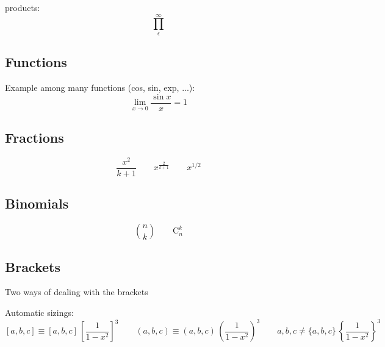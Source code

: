\documentclass[12pt, oneside]{article}
\begin{document}
products:
\begin{displaymath}
\prod_\epsilon^\infty
\end{displaymath}



\subsection{Functions}
Example among many functions (cos, sin, exp, ...):
\begin{displaymath}
\lim_{x \rightarrow 0} \frac{\sin x}{x} = 1
\end{displaymath}



\subsection{Fractions}
\begin{displaymath}
\frac{x^{2}}{k+1} \qquad x^{\frac{2}{k+1}} \qquad x^{1/2} %
\end{displaymath}



\subsection{Binomials}
\begin{displaymath}
\binom{n}{k} \qquad \mathrm{C}_n^k
\end{displaymath}



\subsection{Brackets}
Two ways of dealing with the brackets

Automatic sizings:
\begin{displaymath}
[a, b, c] \equiv [a, b, c] \,
\left[ \frac{1}{1-x^{2}} \right]^3 \qquad
(a, b, c) \equiv (a, b, c) \,
\left( \frac{1}{1-x^{2}} \right)^3 \qquad
{a,b,c} \neq \{a,b,c\} \,
\left\{ \frac{1}{1-x^{2}} \right\}^3 \qquad
\end{displaymath}
\end{document}
